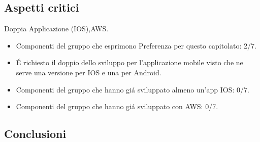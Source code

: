 \subsection{Aspetti critici}
Doppia Applicazione (IOS),AWS.
\begin{itemize}
\item Componenti del gruppo che esprimono Preferenza per questo capitolato: 2/7.
\item \'E richiesto il doppio dello sviluppo per l'applicazione mobile visto che ne serve una versione per IOS e una per Android.
\item Componenti del gruppo che hanno gi\'a sviluppato almeno un'app IOS: 0/7.
\item Componenti del gruppo che hanno gi\'a sviluppato con AWS: 0/7.
\end{itemize}

\subsection{Conclusioni}